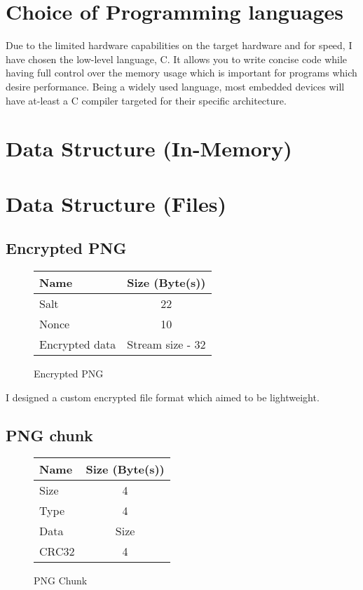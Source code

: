 \documentclass{report}
\begin{document}
\section{Choice of Programming languages}

Due to the limited hardware capabilities on the target hardware and for speed, I have chosen the low-level language, C. It allows you to write concise code while having full control over the memory usage which is important for programs which desire performance. Being a widely used language, most embedded devices will have at-least a C compiler targeted for their specific architecture.

\section{Data Structure (In-Memory)}

\section{Data Structure (Files)}

\subsection{Encrypted PNG}

\begin{figure}[!htb]
\begin{center}
  \begin{tabular}{| l | c |}
   \hline
   Name & Size (Byte(s)) \\
   \hline
   Salt                & 22 \\
   Nonce               & 10 \\
   Encrypted data      & Stream size - 32 \\
   \hline
  \end{tabular}
\end{center}
\caption{Encrypted PNG}
\label{table:png_enc}
\end{figure}


I designed a custom encrypted file format which aimed to be lightweight. 

\subsection{PNG chunk}

\begin{figure}[!htb]
\begin{center}
  \begin{tabular}{| l | c |}
   \hline
   Name & Size (Byte(s)) \\
   \hline
   Size                & 4 \\
   Type                & 4 \\
   Data                & Size \\
   CRC32               & 4 \\
   \hline
  \end{tabular}
\end{center}
\caption{PNG Chunk}
\label{table:png_chunk}
\end{figure}
\end{document}
